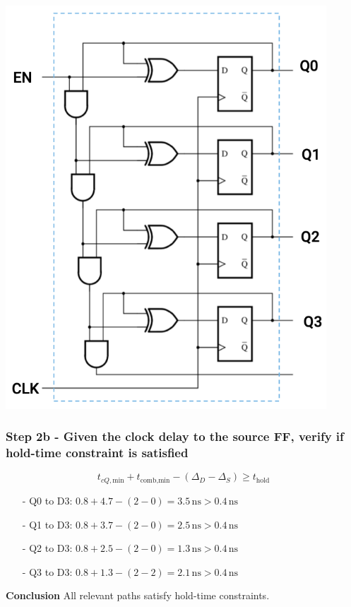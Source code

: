 \documentclass[12pt,openany]{book}
\begin{document}
\begin{minipage}[htp]{0.40\textwidth}
\includegraphics[width=0.9\textwidth]{circuits/15.7.5.png}
\end{minipage}

	\subsubsection*{Step 2b - Given the clock delay to the source FF, verify if hold-time constraint is satisfied}
	\begin{equation*}
	t_{cQ,\text{min}} + t_{\text{comb,min}} - (\Delta_D - \Delta_S) \geq t_{\text{hold}}
	\end{equation*}


\begin{minipage}[htp]{0.40\textwidth}
		\begin{itemize}
			\item[-] Q0 to D3: \( 0.8 + 4.7 - (2 - 0) = 3.5 \, \text{ns} > 0.4 \, \text{ns} \)
			\item[-] Q1 to D3: \( 0.8 + 3.7 - (2 - 0) = 2.5 \, \text{ns} > 0.4 \, \text{ns} \)
			\item[-] Q2 to D3: \( 0.8 + 2.5 - (2 - 0) = 1.3 \, \text{ns} > 0.4 \, \text{ns} \)
			\item[-] Q3 to D3: \( 0.8 + 1.3 - (2 - 2) = 2.1 \, \text{ns} > 0.4 \, \text{ns} \)
		\end{itemize}
\end{minipage}
\hfill
\vline
\hfill
\begin{minipage}[htp]{0.40\textwidth}
	\textbf{Conclusion}\newline
	All relevant paths satisfy hold-time constraints.
\end{minipage}
\end{document}
